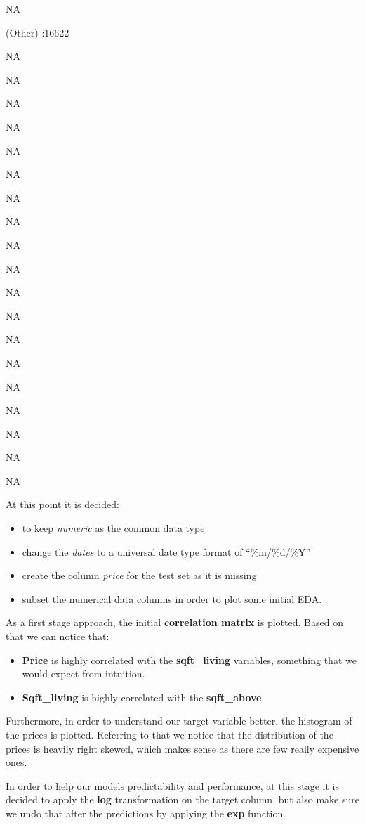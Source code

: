 \documentclass[]{article}
\providecommand{\tightlist}{%
  \setlength{\itemsep}{0pt}\setlength{\parskip}{0pt}}
\begin{document}
NA

(Other) :16622

NA

NA

NA

NA

NA

NA

NA

NA

NA

NA

NA

NA

NA

NA

NA

NA

NA

NA

NA

At this point it is decided:

\begin{itemize}
\tightlist
\item
  to keep \emph{numeric} as the common data type
\item
  change the \emph{dates} to a universal date type format of
  ``\%m/\%d/\%Y''
\item
  create the column \emph{price} for the test set as it is missing
\item
  subset the numerical data columns in order to plot some initial EDA.
\end{itemize}

As a first stage approach, the initial \textbf{correlation matrix} is
plotted. Based on that we can notice that:

\begin{itemize}
\tightlist
\item
  \textbf{Price} is highly correlated with the \textbf{sqft\_living}
  variables, something that we would expect from intuition.
\item
  \textbf{Sqft\_living} is highly correlated with the
  \textbf{sqft\_above}
\end{itemize}

Furthermore, in order to understand our target variable better, the
histogram of the prices is plotted. Referring to that we notice that the
distribution of the prices is heavily right skewed, which makes sense as
there are few really expensive ones.

In order to help our models predictability and performance, at this
stage it is decided to apply the \textbf{log} transformation on the
target column, but also make sure we undo that after the predictions by
applying the \textbf{exp} function.
\end{document}
